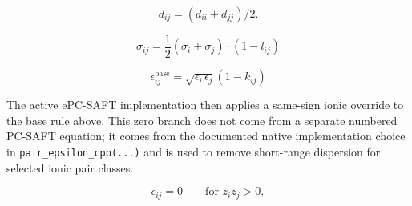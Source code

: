 \documentclass[12pt, letterpaper]{article}
\begin{document}
\begin{equation}
    d_{i j}=\left(d_{i i}+d_{j j}\right) / 2 .
    \label{eq:d_ij}
\end{equation}


\begin{equation}
    \sigma_{i j}=\frac{1}{2}\left(\sigma_{i}+\sigma_{j}\right) \cdot \left(1- l_{ij} \right)
    \label{eq:sigma_ij}
\end{equation}


\begin{equation}
    \epsilon_{ij}^{\mathrm{base}}
    =
    \sqrt{\epsilon_{i}\,\epsilon_{j}}\left(1-k_{ij}\right)
    \label{eq:epsilon_ij_mixing}
\end{equation}


The active ePC-SAFT implementation then applies a same-sign ionic override to the base rule above. This zero branch does not come from a separate numbered PC-SAFT equation; it comes from the documented native implementation choice in \texttt{pair\_epsilon\_cpp(...)} and is used to remove short-range dispersion for selected ionic pair classes.

\begin{equation}
    \epsilon_{ij}=0
    \qquad \text{for } z_{i}z_{j}>0,
\label{eq:epsilon_ij_ionic_zero}
\end{equation}

\end{document}
